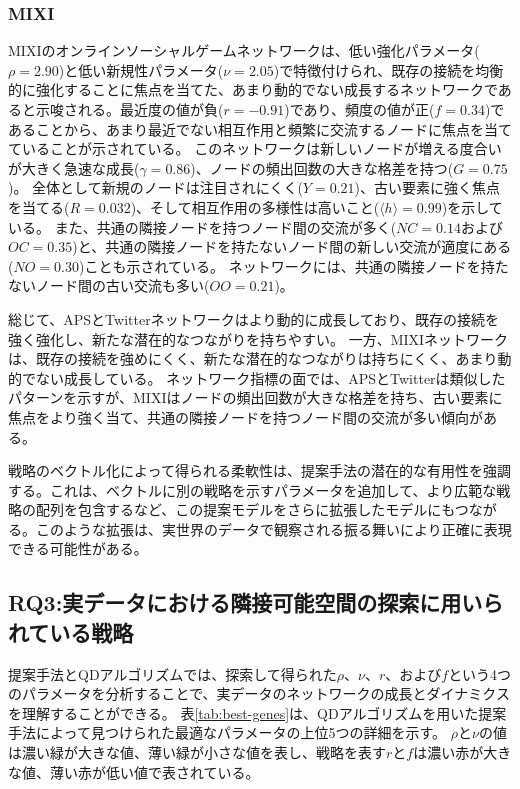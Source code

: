 \documentclass[uplatex,11pt,openany]{ujreport}
\begin{document}
            \subsubsection*{MIXI}
            MIXIのオンラインソーシャルゲームネットワークは、低い強化パラメータ($\rho = 2.90$)と低い新規性パラメータ($\nu = 2.05$)で特徴付けられ、既存の接続を均衡的に強化することに焦点を当てた、あまり動的でない成長するネットワークであると示唆される。最近度の値が負($r = -0.91$)であり、頻度の値が正($f = 0.34$)であることから、あまり最近でない相互作用と頻繁に交流するノードに焦点を当てていることが示されている。
            このネットワークは新しいノードが増える度合いが大きく急速な成長($\gamma = 0.86$)、ノードの頻出回数の大きな格差を持つ($G = 0.75$)。
            全体として新規のノードは注目されにくく($Y = 0.21$)、古い要素に強く焦点を当てる($R = 0.032$)、そして相互作用の多様性は高いこと($\langle h \rangle = 0.99$)を示している。
            また、共通の隣接ノードを持つノード間の交流が多く($NC = 0.14$および$OC = 0.35$)と、共通の隣接ノードを持たないノード間の新しい交流が適度にある($NO = 0.30$)ことも示されている。
            ネットワークには、共通の隣接ノードを持たないノード間の古い交流も多い($OO = 0.21$)。

            総じて、APSとTwitterネットワークはより動的に成長しており、既存の接続を強く強化し、新たな潜在的なつながりを持ちやすい。
            一方、MIXIネットワークは、既存の接続を強めにくく、新たな潜在的なつながりは持ちにくく、あまり動的でない成長している。
            ネットワーク指標の面では、APSとTwitterは類似したパターンを示すが、MIXIはノードの頻出回数が大きな格差を持ち、古い要素に焦点をより強く当て、共通の隣接ノードを持つノード間の交流が多い傾向がある。

            戦略のベクトル化によって得られる柔軟性は、提案手法の潜在的な有用性を強調する。これは、ベクトルに別の戦略を示すパラメータを追加して、より広範な戦略の配列を包含するなど、この提案モデルをさらに拡張したモデルにもつながる。このような拡張は、実世界のデータで観察される振る舞いにより正確に表現できる可能性がある。



        \subsection{RQ3:実データにおける隣接可能空間の探索に用いられている戦略}
            提案手法とQDアルゴリズムでは、探索して得られた$\rho$、$\nu$、$r$、および$f$という4つのパラメータを分析することで、実データのネットワークの成長とダイナミクスを理解することができる。
            表\ref{tab:best-genes}は、QDアルゴリズムを用いた提案手法によって見つけられた最適なパラメータの上位5つの詳細を示す。
            $\rho$と$\nu$の値は濃い緑が大きな値、薄い緑が小さな値を表し、戦略を表す$r$と$f$は濃い赤が大きな値、薄い赤が低い値で表されている。
\end{document}
